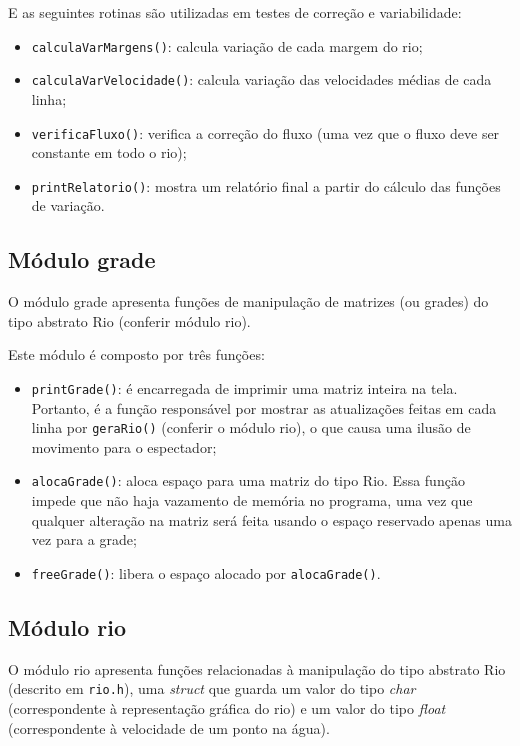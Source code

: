 \documentclass[11pt,a4paper]{article}
\begin{document}
E as seguintes rotinas são utilizadas em testes de correção e variabilidade:

\begin{itemize}
\item \verb|calculaVarMargens()|: calcula variação de cada margem do rio;
\item \verb|calculaVarVelocidade()|: calcula variação das velocidades médias de cada linha;
\item \verb|verificaFluxo()|: verifica a correção do fluxo (uma vez que o fluxo deve ser constante em todo o rio);
\item \verb|printRelatorio()|: mostra um relatório final a partir do cálculo das funções de variação.
\end{itemize}

\subsection{Módulo grade}
O módulo grade apresenta funções de manipulação de matrizes (ou grades) do tipo abstrato Rio (conferir módulo rio).

Este módulo é composto por três funções:
\begin{itemize}
\item \verb|printGrade()|: é encarregada de imprimir uma matriz inteira na tela. Portanto, é a função responsável por mostrar as atualizações feitas em cada linha por \verb|geraRio()| (conferir o módulo rio), o que causa uma ilusão de movimento para o espectador;
\item \verb|alocaGrade()|: aloca espaço para uma matriz do tipo Rio. Essa função impede que não haja vazamento de memória no programa, uma vez que qualquer alteração na matriz será feita usando o espaço reservado apenas uma vez para a grade;
\item \verb|freeGrade()|: libera o espaço alocado por \verb|alocaGrade()|.
\end{itemize}

\subsection{Módulo rio}
O módulo rio apresenta funções relacionadas à manipulação do tipo abstrato Rio (descrito em \verb|rio.h|), uma \textit{struct} que guarda um valor do tipo \textit{char} (correspondente à representação gráfica do rio) e um valor do tipo \textit{float} (correspondente à velocidade de um ponto na água). \\
\end{document}

